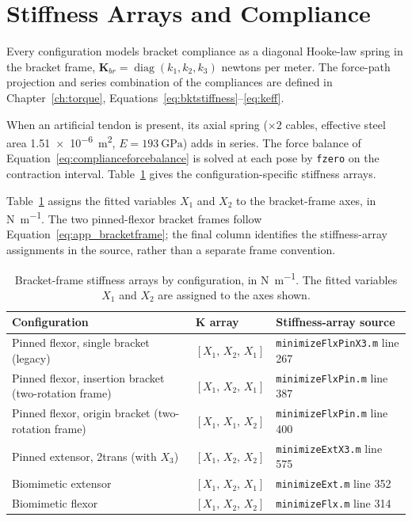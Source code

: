 \section{Stiffness Arrays and Compliance}

Every configuration models bracket compliance as a diagonal Hooke-law spring in the bracket frame, $\mathbf{K}_{br} = \operatorname{diag}(k_{1}, k_{2}, k_{3})$ newtons per meter. The force-path projection and series combination of the compliances are defined in Chapter~\ref{ch:torque}, Equations~\eqref{eq:bktstiffness}--\eqref{eq:keff}.

When an artificial tendon is present, its axial spring ($\times2$ cables, effective steel area \qty{1.51e-6}{\square\meter}, $E=\qty{193}{\giga\pascal}$) adds in series. The force balance of Equation~\eqref{eq:complianceforcebalance} is solved at each pose by \texttt{fzero} on the contraction interval. Table~\ref{tab:app_stiffness_arrays} gives the configuration-specific stiffness arrays.

Table~\ref{tab:app_stiffness_arrays} assigns the fitted variables $X_1$ and $X_2$ to the bracket-frame axes, in \unit{\newton\per\meter}. The two pinned-flexor bracket frames follow Equation~\eqref{eq:app_bracketframe}; the final column identifies the stiffness-array assignments in the source, rather than a separate frame convention.

\begin{table}[htbp]
\caption{Bracket-frame stiffness arrays by configuration, in \unit{\newton\per\meter}. The fitted variables $X_1$ and $X_2$ are assigned to the axes shown.}
\label{tab:app_stiffness_arrays}
\begin{tabularx}{\textwidth}{@{}p{}p{}X@{}}
\toprule
\textbf{Configuration} & $\boldsymbol{K}$ array & \textbf{Stiffness-array source} \\
\midrule
Pinned flexor, single bracket (legacy)       & $[X_{1},\,X_{2},\,X_{1}]$ & \nolinkurl{minimizeFlxPinX3.m} line 267 \\
Pinned flexor, insertion bracket (two-rotation frame)    & $[X_{1},\,X_{2},\,X_{1}]$ & \nolinkurl{minimizeFlxPin.m} line 387 \\
Pinned flexor, origin bracket (two-rotation frame) & $[X_{1},\,X_{1},\,X_{2}]$ & \nolinkurl{minimizeFlxPin.m} line 400 \\
Pinned extensor, 2trans (with $X_{3}$)      & $[X_{1},\,X_{2},\,X_{2}]$ & \nolinkurl{minimizeExtX3.m} line 575 \\
Biomimetic extensor                 & $[X_{1},\,X_{2},\,X_{1}]$ & \nolinkurl{minimizeExt.m} line 352 \\
Biomimetic flexor                   & $[X_{1},\,X_{2},\,X_{2}]$ & \nolinkurl{minimizeFlx.m} line 314 \\
\bottomrule
\end{tabularx}
\end{table}

